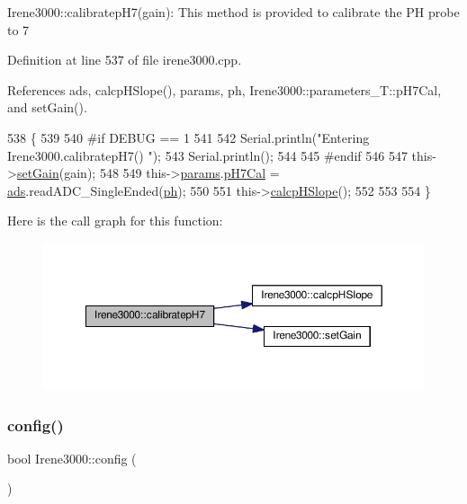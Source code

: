 Irene3000\+::calibratep\+H7(gain)\+: This method is provided to calibrate the PH probe to 7 

Definition at line 537 of file irene3000.\+cpp.



References ads, calcp\+H\+Slope(), params, ph, Irene3000\+::parameters\+\_\+\+T\+::p\+H7\+Cal, and set\+Gain().


\begin{DoxyCode}
538 \{
539 
540 \textcolor{preprocessor}{#if DEBUG == 1 }
541 
542     Serial.println(\textcolor{stringliteral}{"Entering Irene3000.calibratepH7() "});
543     Serial.println();
544 
545 \textcolor{preprocessor}{#endif }
546 
547     this->\hyperlink{classIrene3000_aff7c5da186b388e7272e63ff88a20c34}{setGain}(gain);
548         
549     this->\hyperlink{classIrene3000_a136585a5ee7f9ac6ab52175fa153f8e3}{params}.\hyperlink{structIrene3000_1_1parameters__T_a21265466a570d84bff914f26d2f7a03e}{pH7Cal} = \hyperlink{classIrene3000_a1215e77ba761c9908d80d691f149e135}{ads}.readADC\_SingleEnded(\hyperlink{Irene3000_8h_af771ceafe0e6524dd8497d4305dfe778}{ph});
550  
551     this->\hyperlink{classIrene3000_a81f6a79e546679692053f7ac1af49613}{calcpHSlope}();
552 
553 
554 \}
\end{DoxyCode}
Here is the call graph for this function\+:\nopagebreak
\begin{figure}[H]
\begin{center}
\leavevmode
\includegraphics[width=350pt]{classIrene3000_a2e810ddfa8b95eaa2446a408761c6bdc_cgraph}
\end{center}
\end{figure}
\mbox{\label{classIrene3000_afed5c35e4b23963c157847ef27c11e9c}} 
\subsubsection{\texorpdfstring{config()}{config()}}
{\footnotesize\ttfamily bool Irene3000\+::config (\begin{DoxyParamCaption}{ }\end{DoxyParamCaption})}

